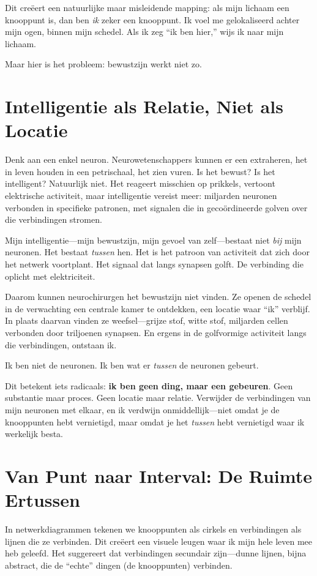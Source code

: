 \documentclass[12pt,a4paper]{article}
\begin{document}
Dit creëert een natuurlijke maar misleidende mapping: als mijn lichaam een knooppunt is, dan ben \textit{ik} zeker een knooppunt. Ik voel me gelokaliseerd achter mijn ogen, binnen mijn schedel. Als ik zeg ``ik ben hier,'' wijs ik naar mijn lichaam.

Maar hier is het probleem: bewustzijn werkt niet zo.

\section*{Intelligentie als Relatie, Niet als Locatie}

Denk aan een enkel neuron. Neurowetenschappers kunnen er een extraheren, het in leven houden in een petrischaal, het zien vuren. Is het bewust? Is het intelligent? Natuurlijk niet. Het reageert misschien op prikkels, vertoont elektrische activiteit, maar intelligentie vereist meer: miljarden neuronen verbonden in specifieke patronen, met signalen die in gecoördineerde golven over die verbindingen stromen.

Mijn intelligentie---mijn bewustzijn, mijn gevoel van zelf---bestaat niet \textit{bij} mijn neuronen. Het bestaat \textit{tussen} hen. Het is het patroon van activiteit dat zich door het netwerk voortplant. Het signaal dat langs synapsen golft. De verbinding die oplicht met elektriciteit.

Daarom kunnen neurochirurgen het bewustzijn niet vinden. Ze openen de schedel in de verwachting een centrale kamer te ontdekken, een locatie waar ``ik'' verblijf. In plaats daarvan vinden ze weefsel---grijze stof, witte stof, miljarden cellen verbonden door triljoenen synapsen. En ergens in de golfvormige activiteit langs die verbindingen, ontstaan ik.

Ik ben niet de neuronen. Ik ben wat er \textit{tussen} de neuronen gebeurt.

Dit betekent iets radicaals: \textbf{ik ben geen ding, maar een gebeuren}. Geen substantie maar proces. Geen locatie maar relatie. Verwijder de verbindingen van mijn neuronen met elkaar, en ik verdwijn onmiddellijk---niet omdat je de knooppunten hebt vernietigd, maar omdat je het \textit{tussen} hebt vernietigd waar ik werkelijk besta.

\section*{Van Punt naar Interval: De Ruimte Ertussen}

In netwerkdiagrammen tekenen we knooppunten als cirkels en verbindingen als lijnen die ze verbinden. Dit creëert een visuele leugen waar ik mijn hele leven mee heb geleefd. Het suggereert dat verbindingen secundair zijn---dunne lijnen, bijna abstract, die de ``echte'' dingen (de knooppunten) verbinden.
\end{document}
